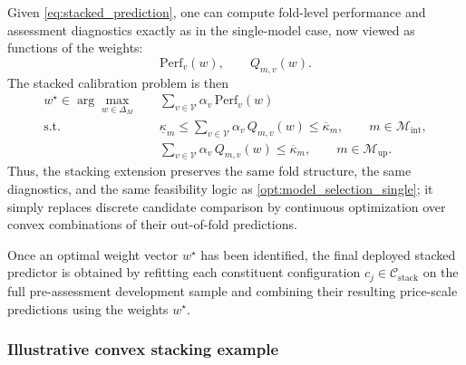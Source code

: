 \documentclass[12pt, draft]{article}
\theoremstyle{plain}
\theoremstyle{definition}
\newcommand{\1}{\mathbf{1}}
\begin{document}
{Given \eqref{eq:stacked_prediction}, one can compute fold-level performance and assessment diagnostics exactly as in the single-model case, now viewed as functions of the weights:
\[
\mathrm{Perf}_v(w),
\qquad
Q_{m,v}(w).
\]
The stacked calibration problem is then
\begin{align}
    \label{opt:model_selection_stacking}
    w^\star
    \in
    \arg\max_{w\in\Delta_M}
    \quad
    & \sum_{v\in\mathcal V}\alpha_v\,\mathrm{Perf}_v(w)
    \\
    \text{s.t.}\quad
    & \underline{\kappa}_m
      \le
      \sum_{v\in\mathcal V}\alpha_v\,Q_{m,v}(w)
      \le
      \overline{\kappa}_m,
      \qquad
      m\in\mathcal M_{\mathrm{int}},
      \nonumber\\
    & \sum_{v\in\mathcal V}\alpha_v\,Q_{m,v}(w)
      \le
      \overline{\kappa}_m,
      \qquad
      m\in\mathcal M_{\mathrm{up}}.
      \nonumber
\end{align}
Thus, the stacking extension preserves the same fold structure, the same diagnostics, and the same feasibility logic as \eqref{opt:model_selection_single}; it simply replaces discrete candidate comparison by continuous optimization over convex combinations of their out-of-fold predictions.

Once an optimal weight vector $w^\star$ has been identified, the final deployed stacked predictor is obtained by refitting each constituent configuration $c_j\in\mathcal C_{\mathrm{stack}}$ on the full pre-assessment development sample and combining their resulting price-scale predictions using the weights $w^\star$.

\subsubsection{Illustrative convex stacking example}
\label{subsubsec:convex_example}

}
\end{document}
